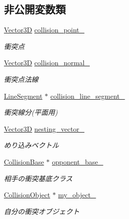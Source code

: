 \subsection*{非公開変数類}
\begin{DoxyCompactItemize}
\item 
\mbox{\hyperlink{class_vector3_d}{Vector3D}} \mbox{\hyperlink{class_collision_information_a84a8bdbfca8c5352cb2fed202c517fa2}{collision\+\_\+point\+\_\+}}
\begin{DoxyCompactList}\small\item\em 衝突点 \end{DoxyCompactList}\item 
\mbox{\hyperlink{class_vector3_d}{Vector3D}} \mbox{\hyperlink{class_collision_information_a140d3d1cc1d73fe4a77a7372e6445474}{collision\+\_\+normal\+\_\+}}
\begin{DoxyCompactList}\small\item\em 衝突点法線 \end{DoxyCompactList}\item 
\mbox{\hyperlink{class_line_segment}{Line\+Segment}} $\ast$ \mbox{\hyperlink{class_collision_information_a427292714a06b762ba87a4d8c6454f2d}{collision\+\_\+line\+\_\+segment\+\_\+}}
\begin{DoxyCompactList}\small\item\em 衝突線分(平面用) \end{DoxyCompactList}\item 
\mbox{\hyperlink{class_vector3_d}{Vector3D}} \mbox{\hyperlink{class_collision_information_ae918ce35491184faf3adba28c5c98774}{nesting\+\_\+vector\+\_\+}}
\begin{DoxyCompactList}\small\item\em めり込みベクトル \end{DoxyCompactList}\item 
\mbox{\hyperlink{class_collision_base}{Collision\+Base}} $\ast$ \mbox{\hyperlink{class_collision_information_ad5a230826a7a53a916bea3116dee807d}{opponent\+\_\+base\+\_\+}}
\begin{DoxyCompactList}\small\item\em 相手の衝突基底クラス \end{DoxyCompactList}\item 
\mbox{\hyperlink{class_collision_object}{Collision\+Object}} $\ast$ \mbox{\hyperlink{class_collision_information_a1d317027ee7d0b53e64a9241d6396b9d}{my\+\_\+object\+\_\+}}
\begin{DoxyCompactList}\small\item\em 自分の衝突オブジェクト \end{DoxyCompactList}\item 

\end{DoxyCompactItemize}
